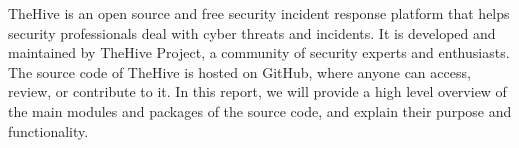 TheHive is an open source and free security incident response platform that helps security professionals deal with cyber threats and incidents. It is developed and maintained by TheHive Project, a community of security experts and enthusiasts. The source code of TheHive is hosted on GitHub, where anyone can access, review, or contribute to it. In this report, we will provide a high level overview of the main modules and packages of the source code, and explain their purpose and functionality.
